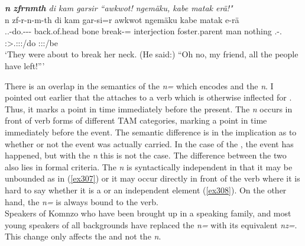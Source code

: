 \begin{exe}
	\ex \emph{\textbf{n} \textbf{zfrnmth} di kam garsir ``awkwot! ngemäku, kabe matak erä!"}\\
	\glll n zf-r-n-m-th di kam gar-si=r awkwot ngemäku\footnotemark{} kabe matak e-rä\\
	\Imn{} \Tsg.\F.\Betatwo-do.\Ext-\Du-\Dur-\Stnsg{} back.of.head bone break-\Nmlz=\Purp{} interjection foster.parent man nothing \Stnsg.\Alph-\Cop.\Ndu\\
	{} \footnotesize{\Stdu:\Sbj>\Tsg.\F:\Obj:\Pst:\Dur/do} {} {} {} {} {} {} {} \footnotesize{\Stpl:\Sbj:\Nonpast:\Ipfv/be}\\
	\trans `They were about to break her neck. (He said:) ``Oh no, my friend, all the people have left!'''
	\label{ex308}
\end{exe}

There is an overlap in the semantics of the  \emph{n=} which encodes  and the   \emph{n}. I pointed out earlier that the   attaches to a verb which is otherwise inflected for . Thus, it marks a point in time immediately before the present. The  \emph{n} occurs in front of verb forms of different TAM categories, marking a point in time immediately before the event. The semantic difference is in the implication as to whether or not the event was actually carried. In the case of the  , the event has happened, but with the  \emph{n} this is not the case. The difference between the two also lies in formal criteria. The  \emph{n} is syntactically independent in that it may be unbounded as in (\ref{ex307}) or it may occur directly in front of the verb where it is hard to say whether it is a  or an independent element (\ref{ex308}). On the other hand, the   \emph{n=} is always bound to the verb.\\

Speakers of Komnzo who have been brought up in a  speaking family, and most young speakers of all backgrounds have replaced the   \emph{n=} with its  equivalent \emph{nz=}. This change only affects the  and not the   \emph{n}.

